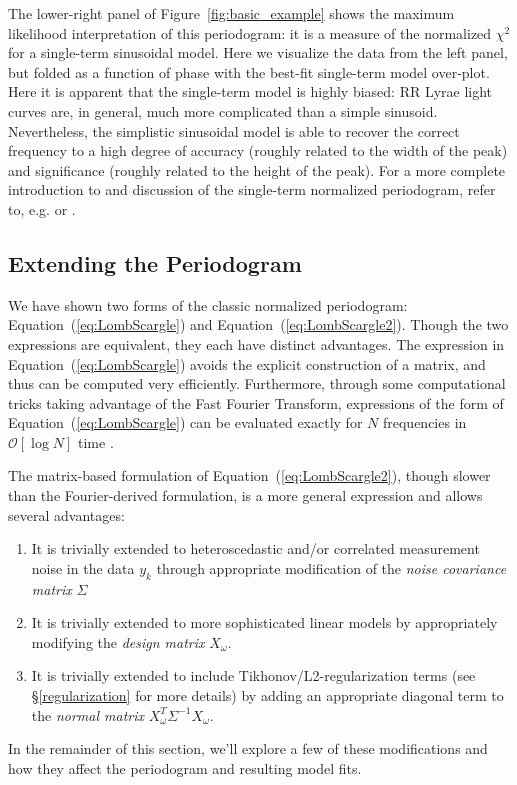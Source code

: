 \documentclass[12pt,preprint]{aastex}
\newcommand{\Fig}[1]{Figure~\ref{fig:#1}}
\newcommand{\fig}[1]{\Fig{#1}}
\newcommand{\Eq}[1]{Equation~(\ref{eq:#1})}
\newcommand{\eq}[1]{\Eq{#1}}
\begin{document}
The lower-right panel of \fig{basic_example} shows the maximum likelihood interpretation of this periodogram: it is a measure of the normalized $\chi^2$ for a single-term sinusoidal model. Here we visualize the data from the left panel, but folded as a function of phase with the best-fit single-term model over-plot. Here it is apparent that the single-term model is highly biased: RR Lyrae light curves are, in general, much more complicated than a simple sinusoid. Nevertheless, the simplistic sinusoidal model is able to recover the correct frequency to a high degree of accuracy (roughly related to the width of the peak) and significance (roughly related to the height of the peak). For a more complete introduction to and discussion of the single-term normalized periodogram, refer to, e.g. \citet{Bretthorst88} or \citet{ICVG2014}.

\subsection{Extending the Periodogram}
We have shown two forms of the classic normalized periodogram: \eq{LombScargle} and \eq{LombScargle2}. Though the two expressions are equivalent, they each have distinct advantages. The expression in \eq{LombScargle} avoids the explicit construction of a matrix, and thus can be computed very efficiently. Furthermore, through some computational tricks taking advantage of the Fast Fourier Transform, expressions of the form of \eq{LombScargle} can be evaluated exactly for $N$ frequencies in $\mathcal{O}[\log{N}]$ time \citep{Press89}.

The matrix-based formulation of \eq{LombScargle2}, though slower than the Fourier-derived formulation, is a more general expression and allows several advantages:
\begin{enumerate}
  \item It is trivially extended to heteroscedastic and/or correlated measurement noise in the data $y_k$ through appropriate modification of the {\it noise covariance matrix} $\Sigma$
  \item It is trivially extended to more sophisticated linear models by appropriately modifying the {\it design matrix} $X_\omega$.
  \item It is trivially extended to include Tikhonov/L2-regularization terms (see \S \ref{regularization} for more details)  by adding an appropriate diagonal term to the {\it normal matrix} $X_\omega^T\Sigma^{-1}X_\omega$.
\end{enumerate}
In the remainder of this section, we'll explore a few of these modifications and how they affect the periodogram and resulting model fits.
\end{document}

